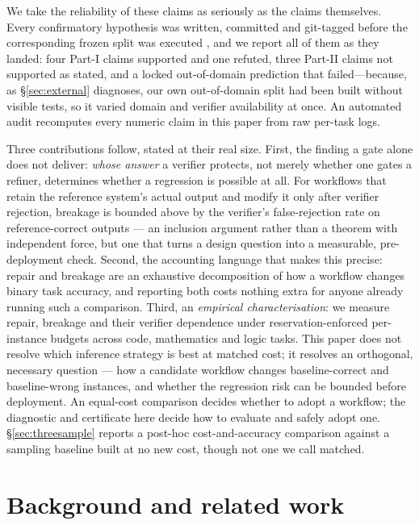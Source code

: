 \documentclass{article}
\begin{document}
We take the reliability of these claims as seriously as the claims themselves.
Every confirmatory hypothesis was written, committed and git-tagged before the
corresponding frozen split was executed \citep{nosek2018preregistration}, and we
report all of them as they landed: four Part-I claims supported and one refuted,
three Part-II claims not supported as stated, and a locked out-of-domain
prediction that failed---because, as \S\ref{sec:external} diagnoses, our own
out-of-domain split had been built without visible tests, so it varied domain
and verifier availability at once. An automated audit recomputes every numeric
claim in this paper from raw per-task logs.

Three contributions follow, stated at their real size. First, the finding a
gate alone does not deliver: \emph{whose answer} a verifier protects, not
merely whether one gates a refiner, determines whether a regression is
possible at all. For workflows that retain the reference system's actual
output and modify it only after verifier rejection, breakage is bounded above
by the verifier's false-rejection rate on reference-correct outputs --- an
inclusion argument rather than a theorem with independent force, but one that
turns a design question into a measurable, pre-deployment check. Second, the
accounting language that makes this precise: repair and breakage are an
exhaustive decomposition of how a workflow changes binary task accuracy, and
reporting both costs nothing extra for anyone already running such a
comparison. Third, an \emph{empirical characterisation}: we measure repair,
breakage and their verifier dependence under reservation-enforced
per-instance budgets across code, mathematics and logic tasks. This paper does
not resolve which inference strategy is best at matched cost; it resolves an
orthogonal, necessary question --- how a candidate workflow changes
baseline-correct and baseline-wrong instances, and whether the regression risk
can be bounded before deployment. An equal-cost comparison decides whether to
adopt a workflow; the diagnostic and certificate here decide how to evaluate
and safely adopt one. \S\ref{sec:threesample} reports a post-hoc
cost-and-accuracy comparison against a sampling baseline built at no new cost,
though not one we call matched.

\section{Background and related work}
\end{document}
